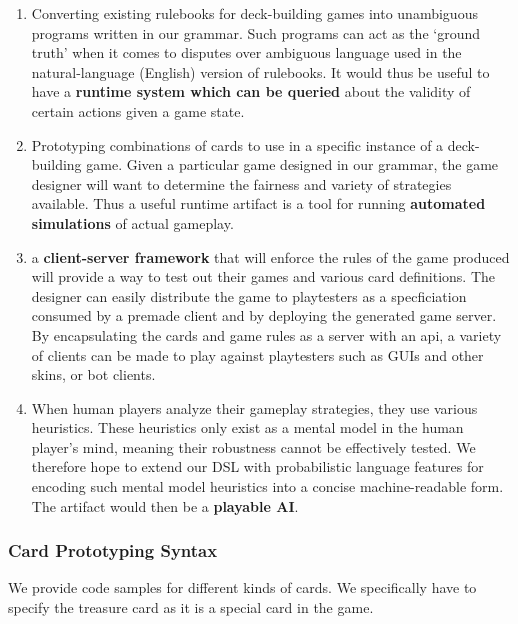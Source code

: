 \documentclass{acm_proc_article-sp}
\begin{document}
\begin{enumerate}
\item Converting existing rulebooks for deck-building games into unambiguous programs written in
our grammar. Such programs can act as the `ground truth' when it comes to disputes over ambiguous
language used in the natural-language (English) version of rulebooks. It would thus be useful to
have a {\bf runtime system which can be queried} about the validity of certain actions given a game state.

\item Prototyping combinations of cards to use in a specific instance of a deck-building game.
Given a particular game designed in our grammar, the game designer will want to determine the
fairness and variety of strategies available. Thus a useful runtime artifact is a tool for
running {\bf automated simulations} of actual gameplay.

\item a {\bf client-server framework} that will enforce the rules of the game produced will provide a way to test out their games and various card definitions. The designer can easily distribute the game to playtesters as a specficiation consumed by a premade client and by deploying the generated game server. By encapsulating the cards and game rules as a server with an api, a variety of clients can be made to play against playtesters such as GUIs and other skins, or bot clients.

\item When human players analyze their gameplay strategies, they use various heuristics.
These heuristics only exist as a mental model in the human player's mind, meaning their
robustness cannot be effectively tested. We therefore hope to extend our DSL with probabilistic
language features for encoding such mental model heuristics into a concise machine-readable form.
The artifact would then be a {\bf playable AI}.

\end{enumerate}

\subsubsection{Card Prototyping Syntax}
We provide code samples for different kinds of cards. We specifically have to specify the
treasure card as it is a special card in the game.
\end{document}
